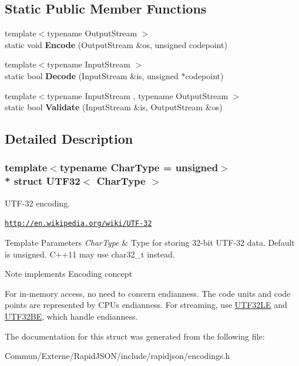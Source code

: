 \subsection*{Static Public Member Functions}
\begin{DoxyCompactItemize}
\item 
{\footnotesize template$<$typename Output\+Stream $>$ }\\static void {\bfseries Encode} (Output\+Stream \&os, unsigned codepoint)\hypertarget{struct_u_t_f32_a511d1b09672ce535085895a28d8c2f13}{}\label{struct_u_t_f32_a511d1b09672ce535085895a28d8c2f13}

\item 
{\footnotesize template$<$typename Input\+Stream $>$ }\\static bool {\bfseries Decode} (Input\+Stream \&is, unsigned $\ast$codepoint)\hypertarget{struct_u_t_f32_a6e7258a5e982e101345dffdc355e9b53}{}\label{struct_u_t_f32_a6e7258a5e982e101345dffdc355e9b53}

\item 
{\footnotesize template$<$typename Input\+Stream , typename Output\+Stream $>$ }\\static bool {\bfseries Validate} (Input\+Stream \&is, Output\+Stream \&os)\hypertarget{struct_u_t_f32_a71336fb0546b3079e01bbd51d2fa2e45}{}\label{struct_u_t_f32_a71336fb0546b3079e01bbd51d2fa2e45}

\end{DoxyCompactItemize}


\subsection{Detailed Description}
\subsubsection*{template$<$typename Char\+Type = unsigned$>$\\*
struct U\+T\+F32$<$ Char\+Type $>$}

U\+T\+F-\/32 encoding. 

\href{http://en.wikipedia.org/wiki/UTF-32}{\tt http\+://en.\+wikipedia.\+org/wiki/\+U\+T\+F-\/32} 
\begin{DoxyTemplParams}{Template Parameters}
{\em Char\+Type} & Type for storing 32-\/bit U\+T\+F-\/32 data. Default is unsigned. C++11 may use char32\+\_\+t instead. \\
\hline
\end{DoxyTemplParams}
\begin{DoxyNote}{Note}
implements Encoding concept

For in-\/memory access, no need to concern endianness. The code units and code points are represented by C\+PU\textquotesingle{}s endianness. For streaming, use \hyperlink{struct_u_t_f32_l_e}{U\+T\+F32\+LE} and \hyperlink{struct_u_t_f32_b_e}{U\+T\+F32\+BE}, which handle endianness. 
\end{DoxyNote}


The documentation for this struct was generated from the following file\+:\begin{DoxyCompactItemize}
\item 
Commun/\+Externe/\+Rapid\+J\+S\+O\+N/include/rapidjson/encodings.\+h\end{DoxyCompactItemize}
